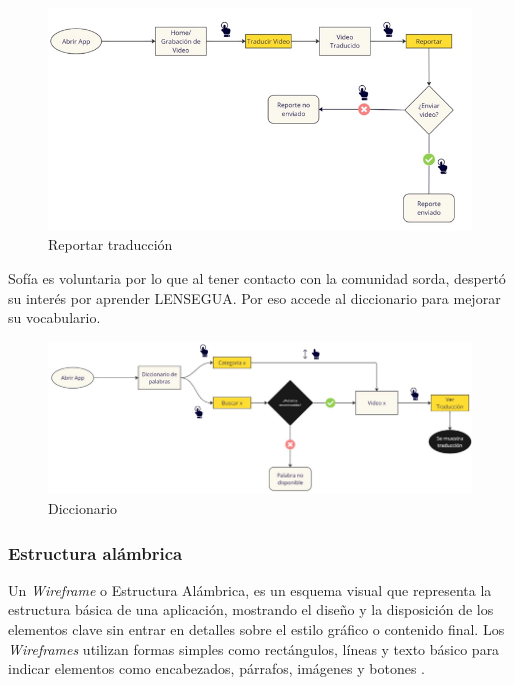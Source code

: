 \begin{figure} [H]
    \centering
    \includegraphics[width=1\linewidth]{figuras/flujo_usuario7.png}
    \caption{Reportar traducción}
    \label{fig:enter-label}
\end{figure}


Sofía es voluntaria por lo que al tener contacto con la comunidad sorda, despertó su interés por aprender LENSEGUA. Por eso accede al diccionario para mejorar su vocabulario. 


\begin{figure} [H]
    \centering
    \includegraphics[width=1\linewidth]{figuras/flujo_usuario8.png}
    \caption{Diccionario}
    \label{fig:enter-label}
\end{figure}



\subsubsection{Estructura alámbrica}

Un \textit{Wireframe} o Estructura Alámbrica, es un esquema visual que representa la estructura básica de una aplicación, mostrando el diseño y la disposición de los elementos clave sin entrar en detalles sobre el estilo gráfico o contenido final. Los \textit{Wireframes} utilizan formas simples como rectángulos, líneas y texto básico para indicar elementos como encabezados, párrafos, imágenes y botones \cite{Rees2024}.

